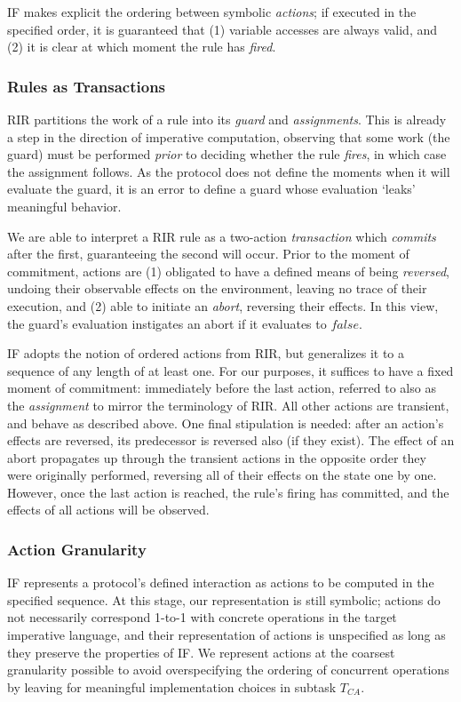 IF makes explicit the ordering between symbolic \textit{actions}; if executed in the specified order, it is guaranteed that (1) variable accesses are always valid, and (2) it is clear at which moment the rule has \textit{fired}.

\subsubsection{Rules as Transactions}

RIR partitions the work of a rule into its \textit{guard} and \textit{assignments}. This is already a step in the direction of imperative computation, observing that some work (the guard) must be performed \textit{prior} to deciding whether the rule \textit{fires}, in which case the assignment follows. As the protocol does not define the moments when it will evaluate the guard, it is an error to define a guard whose evaluation `leaks' meaningful behavior. 

We are able to interpret a RIR rule as a two-action \textit{transaction} which \textit{commits} after the first, guaranteeing the second will occur. Prior to the moment of commitment, actions are (1) obligated to have a defined means of being \textit{reversed}, undoing their observable effects on the environment, leaving no trace of their execution, and (2) able to initiate an \textit{abort}, reversing their effects. In this view, the guard's evaluation instigates an abort if it evaluates to $false$.

IF adopts the notion of ordered actions from RIR, but generalizes it to a sequence of any length of at least one. For our purposes, it suffices to have a fixed moment of commitment: immediately before the last action, referred to also as the \textit{assignment} to mirror the terminology of RIR. All other actions are transient, and behave as described above. One final stipulation is needed: after an action's effects are reversed, its predecessor is reversed also (if they exist). The effect of an abort propagates up through the transient actions in the opposite order they were originally performed, reversing all of their effects on the state one by one. However, once the last action is reached, the rule's firing has committed, and the effects of all actions will be observed.

\subsubsection{Action Granularity}
IF represents a protocol's defined interaction as actions to be computed in the specified sequence. At this stage, our representation is still symbolic; actions do not necessarily correspond 1-to-1 with concrete operations in the target imperative language, and their representation of actions is unspecified as long as they preserve the properties of IF. We represent actions at the coarsest granularity possible to avoid overspecifying the ordering of concurrent operations by leaving for meaningful implementation choices in subtask $T_{CA}$.

